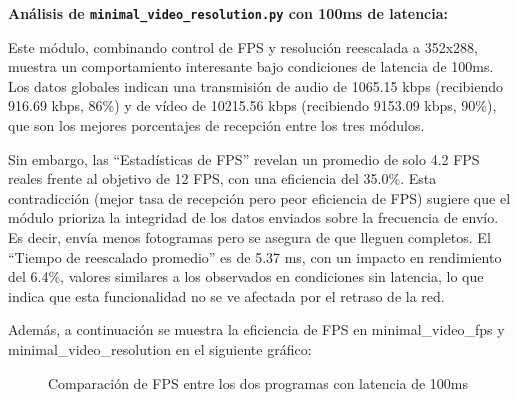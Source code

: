 \vspace{\baselineskip}

\textbf{Análisis de \texttt{minimal\_video\_resolution.py} con 100ms de latencia:}
\vspace{\baselineskip}

Este módulo, combinando control de FPS y resolución reescalada a 352x288, muestra un comportamiento interesante bajo condiciones de latencia de 100ms. Los datos globales indican una transmisión de audio de 1065.15 kbps (recibiendo 916.69 kbps, 86\%) y de vídeo de 10215.56 kbps (recibiendo 9153.09 kbps, 90\%), que son los mejores porcentajes de recepción entre los tres módulos.
\vspace{\baselineskip}

Sin embargo, las ``Estadísticas de FPS'' revelan un promedio de solo 4.2 FPS reales frente al objetivo de 12 FPS, con una eficiencia del 35.0\%. Esta contradicción (mejor tasa de recepción pero peor eficiencia de FPS) sugiere que el módulo prioriza la integridad de los datos enviados sobre la frecuencia de envío. Es decir, envía menos fotogramas pero se asegura de que lleguen completos. El ``Tiempo de reescalado promedio'' es de 5.37 ms, con un impacto en rendimiento del 6.4\%, valores similares a los observados en condiciones sin latencia, lo que indica que esta funcionalidad no se ve afectada por el retraso de la red.

\vspace{\baselineskip}

Además, a continuación se muestra la eficiencia de FPS en minimal\_video\_fps y minimal\_video\_resolution en el siguiente gráfico:
\begin{figure}[H]
\centering
{}
\caption{Comparación de FPS entre los dos programas con latencia de 100ms}
\label{fig:comparacionfps_100ms}
\end{figure}

